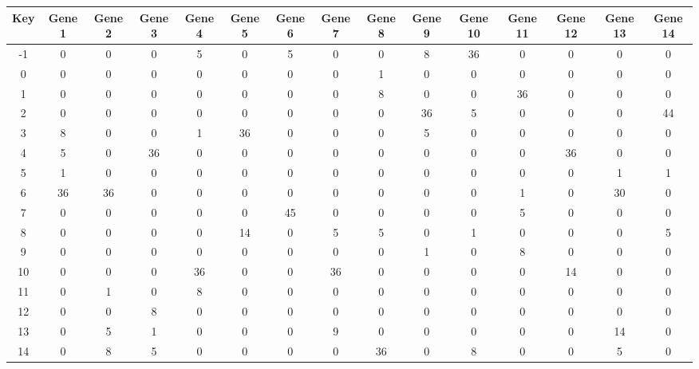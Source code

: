 \begin{tabular}{|c|c|c|c|c|c|c|c|c|c|c|c|c|c|c|}
\hline
Key & Gene 1 & Gene 2 & Gene 3 & Gene 4 & Gene 5 & Gene 6 & Gene 7 & Gene 8 & Gene 9 & Gene 10 & Gene 11 & Gene 12 & Gene 13 & Gene 14 \\
\hline
-1 & 0 & 0 & 0 & 5 & 0 & 5 & 0 & 0 & 8 & 36 & 0 & 0 & 0 & 0 \\
0 & 0 & 0 & 0 & 0 & 0 & 0 & 0 & 1 & 0 & 0 & 0 & 0 & 0 & 0 \\
1 & 0 & 0 & 0 & 0 & 0 & 0 & 0 & 8 & 0 & 0 & 36 & 0 & 0 & 0 \\
2 & 0 & 0 & 0 & 0 & 0 & 0 & 0 & 0 & 36 & 5 & 0 & 0 & 0 & 44 \\
3 & 8 & 0 & 0 & 1 & 36 & 0 & 0 & 0 & 5 & 0 & 0 & 0 & 0 & 0 \\
4 & 5 & 0 & 36 & 0 & 0 & 0 & 0 & 0 & 0 & 0 & 0 & 36 & 0 & 0 \\
5 & 1 & 0 & 0 & 0 & 0 & 0 & 0 & 0 & 0 & 0 & 0 & 0 & 1 & 1 \\
6 & 36 & 36 & 0 & 0 & 0 & 0 & 0 & 0 & 0 & 0 & 1 & 0 & 30 & 0 \\
7 & 0 & 0 & 0 & 0 & 0 & 45 & 0 & 0 & 0 & 0 & 5 & 0 & 0 & 0 \\
8 & 0 & 0 & 0 & 0 & 14 & 0 & 5 & 5 & 0 & 1 & 0 & 0 & 0 & 5 \\
9 & 0 & 0 & 0 & 0 & 0 & 0 & 0 & 0 & 1 & 0 & 8 & 0 & 0 & 0 \\
10 & 0 & 0 & 0 & 36 & 0 & 0 & 36 & 0 & 0 & 0 & 0 & 14 & 0 & 0 \\
11 & 0 & 1 & 0 & 8 & 0 & 0 & 0 & 0 & 0 & 0 & 0 & 0 & 0 & 0 \\
12 & 0 & 0 & 8 & 0 & 0 & 0 & 0 & 0 & 0 & 0 & 0 & 0 & 0 & 0 \\
13 & 0 & 5 & 1 & 0 & 0 & 0 & 9 & 0 & 0 & 0 & 0 & 0 & 14 & 0 \\
14 & 0 & 8 & 5 & 0 & 0 & 0 & 0 & 36 & 0 & 8 & 0 & 0 & 5 & 0 \\
\hline
\end{tabular}